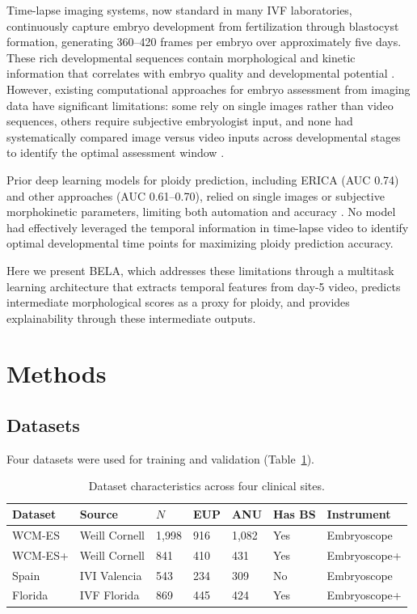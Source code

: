 \documentclass[11pt]{article}
\begin{document}
Time-lapse imaging systems, now standard in many IVF laboratories, continuously capture embryo development from fertilization through blastocyst formation, generating 360--420 frames per embryo over approximately five days. These rich developmental sequences contain morphological and kinetic information that correlates with embryo quality and developmental potential \citep{meseguer2011selection}. However, existing computational approaches for embryo assessment from imaging data have significant limitations: some rely on single images rather than video sequences, others require subjective embryologist input, and none had systematically compared image versus video inputs across developmental stages to identify the optimal assessment window \citep{bormann2020performance, liao2021development}.

Prior deep learning models for ploidy prediction, including ERICA (AUC 0.74) and other approaches (AUC 0.61--0.70), relied on single images or subjective morphokinetic parameters, limiting both automation and accuracy \citep{barnes2023erica}. No model had effectively leveraged the temporal information in time-lapse video to identify optimal developmental time points for maximizing ploidy prediction accuracy.

Here we present BELA, which addresses these limitations through a multitask learning architecture that extracts temporal features from day-5 video, predicts intermediate morphological scores as a proxy for ploidy, and provides explainability through these intermediate outputs.

\section{Methods}

\subsection{Datasets}

Four datasets were used for training and validation (Table~\ref{tab:datasets}).

\begin{table}[htbp]
\centering
\caption{Dataset characteristics across four clinical sites.}
\label{tab:datasets}
\begin{tabular}{lllllll}
\toprule
Dataset & Source & $N$ & EUP & ANU & Has BS & Instrument \\
\midrule
WCM-ES & Weill Cornell & 1,998 & 916 & 1,082 & Yes & Embryoscope \\
WCM-ES+ & Weill Cornell & 841 & 410 & 431 & Yes & Embryoscope+ \\
Spain & IVI Valencia & 543 & 234 & 309 & No & Embryoscope \\
Florida & IVF Florida & 869 & 445 & 424 & Yes & Embryoscope+ \\
\bottomrule
\end{tabular}
\end{table}
\end{document}
